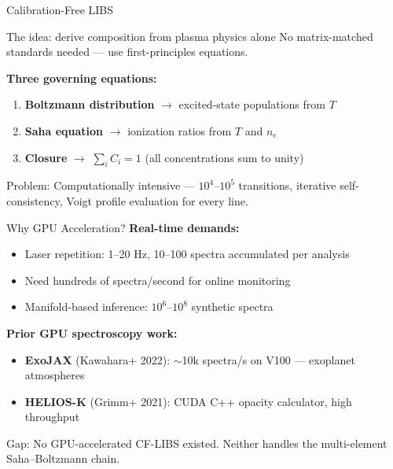 \documentclass[aspectratio=169,10pt]{beamer}
\begin{document}
\begin{frame}{Calibration-Free LIBS}
	\begin{block}{The idea: derive composition from plasma physics alone}
		No matrix-matched standards needed --- use first-principles equations.
	\end{block}

	\vspace{0.5em}
	\textbf{Three governing equations:}
	\begin{enumerate}
		\item \textbf{Boltzmann distribution} $\to$ excited-state populations from $T$
		\item \textbf{Saha equation} $\to$ ionization ratios from $T$ and $n_e$
		\item \textbf{Closure} $\to$ $\sum_i C_i = 1$ (all concentrations sum to unity)
	\end{enumerate}

	\vspace{0.5em}
	\alert{Problem:} Computationally intensive --- $10^4$--$10^5$ transitions,
	iterative self-consistency, Voigt profile evaluation for every line.
\end{frame}

\begin{frame}{Why GPU Acceleration?}
	\textbf{Real-time demands:}
	\begin{itemize}
		\item Laser repetition: 1--20 Hz, 10--100 spectra accumulated per analysis
		\item Need hundreds of spectra/second for online monitoring
		\item Manifold-based inference: $10^6$--$10^8$ synthetic spectra
	\end{itemize}

	\vspace{0.5em}
	\textbf{Prior GPU spectroscopy work:}
	\begin{itemize}
		\item \textbf{ExoJAX} (Kawahara+ 2022): $\sim$10k spectra/s on V100 --- exoplanet atmospheres
		\item \textbf{HELIOS-K} (Grimm+ 2021): CUDA C++ opacity calculator, high throughput
	\end{itemize}

	\vspace{0.3em}
	\alert{Gap:} No GPU-accelerated CF-LIBS existed.
	Neither handles the multi-element Saha--Boltzmann chain.
\end{frame}
\end{document}
